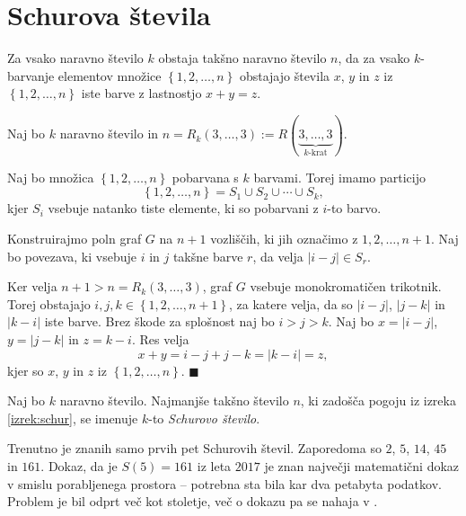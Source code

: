 \documentclass[twoside,11pt]{article}
\providecommand{\set}[1]{\left\{#1\right\}}
\providecommand{\abs}[1]{\left\lvert #1\right\rvert}
\begin{document}
\section{Schurova števila}

\begin{izrek}[Schur] \label{izrek:schur}
    Za vsako naravno število $k$ obstaja takšno naravno število $n$, da za vsako 
    $k$-barvanje elementov množice $\set{1, 2, \dots, n}$ obstajajo števila $x$, $y$ in $z$
    iz $\set{1, 2, \dots, n}$ iste barve z lastnostjo $x + y = z$.
\end{izrek}

\begin{dokaz}
    Naj bo $k$ naravno število in $n = R_k(3, \dots, 3) := R(\underbrace{3, \dots, 3}_{\text{$k$-krat}})$.
    
    Naj bo množica $\set{1, 2, \dots, n}$ pobarvana s $k$ barvami. 
    Torej imamo particijo
    \[
        \set{1, 2, \dots, n} = S_1 \cup S_2 \cup \cdots \cup S_k,
    \]
    kjer $S_i$ vsebuje natanko tiste elemente, ki so pobarvani z $i$-to barvo.

    Konstruirajmo poln graf $G$ na $n+1$ vozliščih, ki jih označimo z
    $1, 2, \dots, n+1$. Naj bo povezava, ki vsebuje $i$ in $j$ takšne barve $r$,
    da velja $\abs{i-j} \in S_r$. 

    Ker velja $n+1 > n = R_k(3, \dots, 3)$, graf $G$ vsebuje monokromatičen 
    trikotnik. Torej obstajajo $i, j, k \in \set{1,2, \dots, n+1}$, za katere 
    velja, da so $\abs{i-j}$, $\abs{j-k}$ in $\abs{k-i}$ iste barve. Brez škode 
    za splošnost naj bo $i > j > k$. Naj bo $x = \abs{i - j}$, $y = \abs{j - k}$ in 
    $z = {k - i}$. Res velja
    \[
        x + y = i - j + j - k = \abs{k - i} = z,
    \]
    kjer so $x$, $y$ in $z$ iz $\set{1, 2, \dots, n}$. \hfill $\blacksquare$
\end{dokaz}

\begin{definicija}
    Naj bo $k$ naravno število. Najmanjše takšno število $n$, ki zadošča 
    pogoju iz izreka \ref{izrek:schur}, se imenuje 
    $k$-to \emph{Schurovo število}.
\end{definicija}

Trenutno je znanih samo prvih pet Schurovih števil. Zaporedoma so $2$, $5$,
$14$, $45$ in $161$. Dokaz, da je $S(5) = 161$ iz leta $2017$ je znan največji 
matematični dokaz v smislu porabljenega prostora -- potrebna sta bila 
kar dva petabyta podatkov. Problem je bil odprt več kot stoletje, več 
o dokazu pa se nahaja v \cite{schur}.
\end{document}

